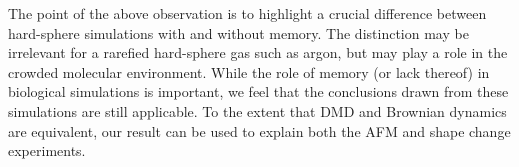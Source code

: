 The point of the above observation is to highlight a crucial difference between hard-sphere simulations with and without memory. The distinction may be irrelevant for a rarefied hard-sphere gas such as argon, but may play a role in the crowded molecular environment. While the role of memory (or lack thereof) in biological simulations is important, we feel that the conclusions drawn from these simulations are still applicable. To the extent that DMD and Brownian dynamics are equivalent, our result can be used to explain both the AFM and shape change experiments.

